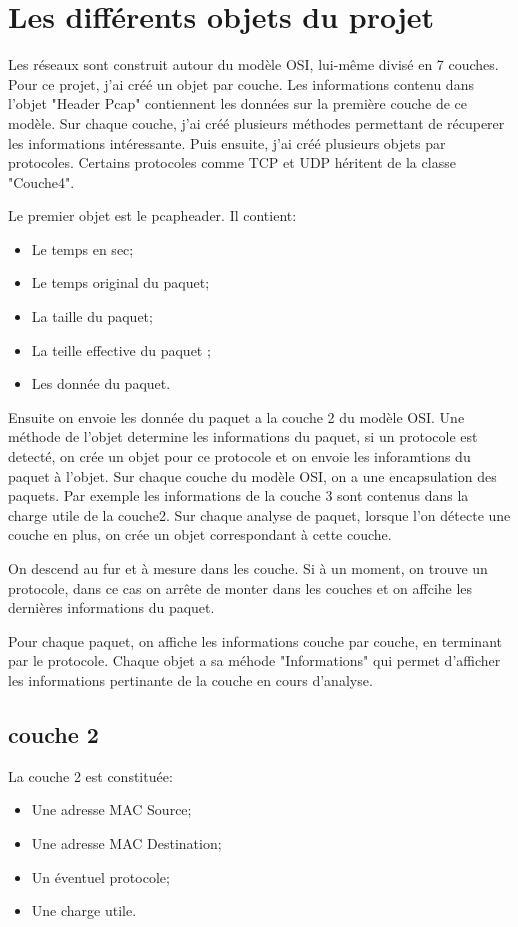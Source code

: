 \section{Les différents objets du projet}

Les réseaux sont construit autour du modèle OSI, lui-même divisé en 7 couches.
Pour ce projet, j'ai créé un objet par couche. Les informations contenu dans l'objet "Header Pcap" contiennent les données sur la première couche de ce modèle.
Sur chaque couche, j'ai créé plusieurs méthodes permettant de récuperer les informations intéressante.
Puis ensuite, j'ai créé plusieurs objets par protocoles. Certains protocoles comme TCP et UDP héritent de la classe "Couche4".

Le premier objet est le pcapheader. Il contient:
\begin{itemize}
    \item Le temps en sec;
    \item Le temps original du paquet;
    \item La taille du paquet;
    \item La teille effective du paquet ;
    \item Les donnée du paquet.
\end{itemize}   

Ensuite on envoie les donnée du paquet a la couche 2 du modèle OSI.
Une méthode de l'objet determine les informations du paquet, si un protocole est detecté, on crée un objet pour ce protocole et on envoie les inforamtions du paquet à l'objet.
Sur chaque couche du modèle OSI, on a une encapsulation des paquets. Par exemple les informations de la couche 3 sont contenus dans la charge utile de la couche2.
Sur chaque analyse de paquet, lorsque l'on détecte une couche en plus, on crée un objet correspondant à cette couche.

On descend au fur et à mesure dans les couche. Si à un moment, on trouve un protocole, dans ce cas on arrête de monter dans les couches et on affcihe les dernières informations du paquet.

Pour chaque paquet, on affiche les informations couche par couche, en terminant par le protocole.
Chaque objet a sa méhode "Informations" qui permet d'afficher les informations pertinante de la couche en cours d'analyse.
\subsection{couche 2}
La couche 2 est constituée:
\begin{itemize}
    \item Une adresse MAC Source;
    \item Une adresse MAC Destination;
    \item Un éventuel protocole;
    \item Une charge utile.
\end{itemize}      
